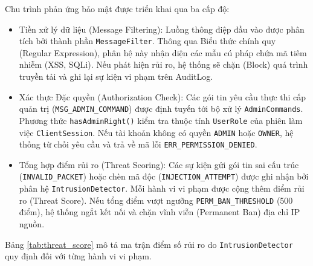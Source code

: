 Chu trình phản ứng bảo mật được triển khai qua ba cấp độ:
\begin{itemize}[label={-}]
    \item Tiền xử lý dữ liệu (Message Filtering): Luồng thông điệp đầu vào được phân tích bởi thành phần \texttt{MessageFilter}. Thông qua Biểu thức chính quy (Regular Expression), phân hệ này nhận diện các mẫu cú pháp chứa mã tiêm nhiễm (XSS, SQLi). Nếu phát hiện rủi ro, hệ thống sẽ chặn (Block) quá trình truyền tải và ghi lại sự kiện vi phạm trên AuditLog.
    \item Xác thực Đặc quyền (Authorization Check): Các gói tin yêu cầu thực thi cấp quản trị (\texttt{MSG\_ADMIN\_COMMAND}) được định tuyến tới bộ xử lý \texttt{AdminCommands}. Phương thức \texttt{hasAdminRight()} kiểm tra thuộc tính \texttt{UserRole} của phiên làm việc \texttt{ClientSession}. Nếu tài khoản không có quyền \texttt{ADMIN} hoặc \texttt{OWNER}, hệ thống từ chối yêu cầu và trả về mã lỗi \texttt{ERR\_PERMISSION\_DENIED}.
    \item Tổng hợp điểm rủi ro (Threat Scoring): Các sự kiện gửi gói tin sai cấu trúc (\texttt{INVALID\_PACKET}) hoặc chèn mã độc (\texttt{INJECTION\_ATTEMPT}) được ghi nhận bởi phân hệ \texttt{IntrusionDetector}. Mỗi hành vi vi phạm được cộng thêm điểm rủi ro (Threat Score). Nếu tổng điểm vượt ngưỡng \texttt{PERM\_BAN\_THRESHOLD} (500 điểm), hệ thống ngắt kết nối và chặn vĩnh viễn (Permanent Ban) địa chỉ IP nguồn.
\end{itemize}

Bảng \ref{tab:threat_score} mô tả ma trận điểm số rủi ro do \texttt{IntrusionDetector} quy định đối với từng hành vi vi phạm.

